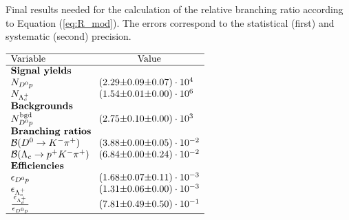  
\begin{table}[tb]
    \centering
    \caption{Final results needed for the calculation of the relative branching ratio \R according to Equation (\ref{eq:R_mod}). The errors correspond to the statistical (first) and systematic (second) precision.}
    \label{tab:table_finalresults}
    $\begin{array}{lr@{\pm}r@{\pm}l}
    \hline
    \text{Variable} & \multicolumn{3}{c}{\text{Value}} \\
    \hline
\multicolumn{4}{l}{\text{\textbf{Signal yields}}} \\
\NDp&(2.29 & 0.09 & 0.07) \cdot 10^{4}\\
\NLc&(1.54 & 0.01 & 0.00) \cdot 10^{6}\\
\multicolumn{4}{l}{\text{\textbf{Backgrounds}}} \\
\NBgdDp&(2.75 & 0.10 & 0.00) \cdot 10^{3}\\
\multicolumn{4}{l}{\text{\textbf{Branching ratios}}} \\
\DBFDp&(3.88 & 0.00 & 0.05) \cdot 10^{-2}\\
\DBFLc&(6.84 & 0.00 & 0.24) \cdot 10^{-2}\\
\multicolumn{4}{l}{\text{\textbf{Efficiencies}}} \\
\effDp&(1.68 & 0.07 & 0.11) \cdot 10^{-3}\\
\effLc&(1.31 & 0.06 & 0.00) \cdot 10^{-3}\\
\frac{\effLc}{\effDp}&(7.81 & 0.49 & 0.50) \cdot 10^{-1}\\

    \hline
    \end{array}$
\end{table}
